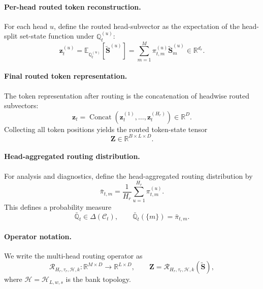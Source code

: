 \documentclass{article}
\theoremstyle{plain}
\theoremstyle{definition}
\theoremstyle{remark}
\begin{document}
\paragraph{Per-head routed token reconstruction.}
For each head $u$, define the routed head-subvector as the expectation of the head-split set-state function under $\mathbb Q_t^{(u)}$:
\begin{equation}
\label{eq:per-head-routed}
\mathbf z_t^{(u)}
=
\mathbb E_{\mathbb Q_t^{(u)}}[\widetilde{\mathbf S}^{(u)}]
=
\sum_{m=1}^M \pi_{t,m}^{(u)}\widetilde{\mathbf S}^{(u)}_m
\in\mathbb R^{d_r}.
\end{equation}

\paragraph{Final routed token representation.}
The token representation after routing is the concatenation of headwise routed subvectors:
\begin{equation}
\label{eq:routed-token}
\mathbf z_t
=
\operatorname{Concat}(\mathbf z_t^{(1)},\dots,\mathbf z_t^{(H_r)})
\in\mathbb R^D.
\end{equation}
Collecting all token positions yields the routed token-state tensor
\begin{equation}
\label{eq:routed-tokens}
\mathbf Z\in\mathbb R^{B\times L\times D}.
\end{equation}

\paragraph{Head-aggregated routing distribution.}
For analysis and diagnostics, define the head-aggregated routing distribution by
\begin{equation}
\label{eq:aggregated-routing}
\bar\pi_{t,m}=\frac{1}{H_r}\sum_{u=1}^{H_r}\pi_{t,m}^{(u)}.
\end{equation}
This defines a probability measure
\begin{equation}
\label{eq:aggregated-routing-measure}
\bar{\mathbb Q}_t\in\Delta(\mathcal C_t),
\qquad
\bar{\mathbb Q}_t(\{m\})=\bar\pi_{t,m}.
\end{equation}

\paragraph{Operator notation.}
We write the multi-head routing operator as
\begin{equation}
\label{eq:routing-operator}
\mathcal R_{H_r,\tau_r,\mathcal H,k}:\mathbb R^{M\times D}\to\mathbb R^{L\times D},
\qquad
\mathbf Z=\mathcal R_{H_r,\tau_r,\mathcal H,k}(\widetilde{\mathbf S}),
\end{equation}
where $\mathcal H=\mathcal H_{L,w,s}$ is the bank topology.
\end{document}
